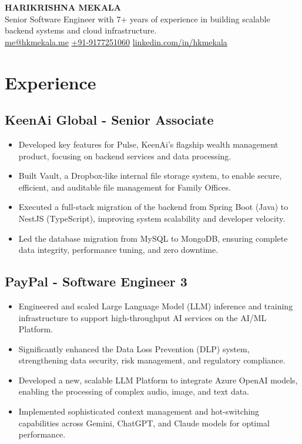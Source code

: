\documentclass[11pt]{article}
\begin{document}
\begin{center}
    {\Huge\bfseries\uppercase{Harikrishna Mekala}} \\ \medskip
    {\large Senior Software Engineer with 7+ years of experience in building scalable backend systems and cloud infrastructure.} \\ \medskip
    \href{mailto:me@hkmekala.me}{me@hkmekala.me} \quad
    \href{tel:+919177251060}{+91-9177251060} \quad
    \href{https://www.linkedin.com/in/hkmekala}{linkedin.com/in/hkmekala}
\end{center}

\section{Experience}
\subsection{\textbf{KeenAi Global} - Senior Associate  }
\begin{itemize}
    \item Developed key features for Pulse, KeenAi's flagship wealth management product, focusing on backend services and data processing.
    \item Built Vault, a Dropbox-like internal file storage system, to enable secure, efficient, and auditable file management for Family Offices.
    \item Executed a full-stack migration of the backend from Spring Boot (Java) to NestJS (TypeScript), improving system scalability and developer velocity.
    \item Led the database migration from MySQL to MongoDB, ensuring complete data integrity, performance tuning, and zero downtime.
\end{itemize}

\subsection{\textbf{PayPal} - Software Engineer 3  }
\begin{itemize}
	\item Engineered and scaled Large Language Model (LLM) inference and training infrastructure to support high-throughput AI services on the AI/ML Platform.
    \item Significantly enhanced the Data Loss Prevention (DLP) system, strengthening data security, risk management, and regulatory compliance.
    \item Developed a new, scalable LLM Platform to integrate Azure OpenAI models, enabling the processing of complex audio, image, and text data.
    \item Implemented sophisticated context management and hot-switching capabilities across Gemini, ChatGPT, and Claude models for optimal performance.
\end{itemize}
\end{document}
